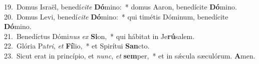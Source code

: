 {19.~}Domus Israël, benedí\textit{ci}\textit{te} \textbf{Dó}mino:~* domus Aaron, benedícite \textbf{Dó}mino.\\
{20.~}Domus Levi, benedí\textit{ci}\textit{te} \textbf{Dó}mino:~* qui timétis Dóminum, benedícite \textbf{Dó}mino.\\
{21.~}Benedíctus Dómi\textit{nus} \textit{ex} \textbf{Si}on,~* qui hábitat in Je\textbf{rú}salem.\\
{22.~}Glória Pa\textit{tri}, \textit{et} \textbf{Fí}lio,~* et Spirítui \textbf{San}cto.\\
{23.~}Sicut erat in princípio, et \textit{nunc}, \textit{et} \textbf{sem}per,~* et in sǽcula sæculórum. \textbf{A}men.\\
